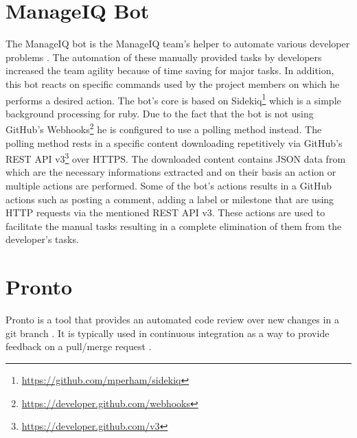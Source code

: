 \section{ManageIQ Bot}

The ManageIQ bot is the ManageIQ team's helper to automate various developer problems \cite{MIQBOT}. The automation of these manually provided tasks by developers increased the team agility because of time saving for major tasks. In addition, this bot reacts on specific commands used by the project members on which he performs a desired action. The bot's core is based on Sidekiq\footnote{\url{https://github.com/mperham/sidekiq}} which is a simple background processing for ruby. Due to the fact that the bot is not using GitHub's Webhooks\footnote{\url{https://developer.github.com/webhooks}} he is configured to use a polling method instead. The polling method rests in a specific content downloading repetitively via GitHub's REST API v3\footnote{\url{https://developer.github.com/v3}} over HTTPS. The downloaded content contains JSON data from which are the necessary informations extracted and on their basis an action or multiple actions are performed. Some of the bot's actions results in a GitHub actions such as posting a comment, adding a label or milestone that are using HTTP requests via the mentioned REST API v3. These actions are used to facilitate the manual tasks resulting in a complete elimination of them from the developer's tasks.

\section{Pronto}

Pronto is a tool that provides an automated code review over new changes in a git branch \cite{PRONTO-1}. It is typically used in continuous integration as a way to provide feedback on a pull/merge request \cite{PRONTO-1}.\\

